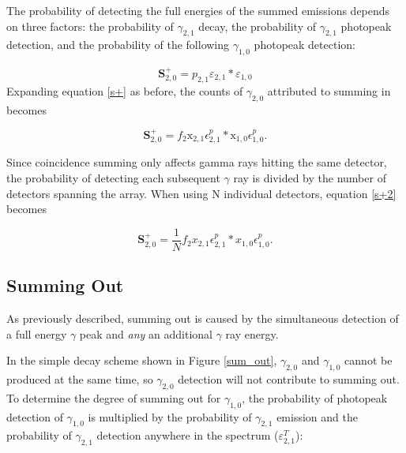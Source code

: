 \documentclass[12pt,twoside]{reedthesis}
\begin{document}
The probability of detecting the full energies of the summed emissions depends on three factors: the probability of $\gamma_{2,1}$ decay, the probability of $\gamma_{2,1}$ photopeak detection, and the probability of the following $\gamma_{1,0}$ photopeak detection:

\begin{equation}
\textbf{S}_{2,0}^{+} = p_{2,1} \varepsilon_{2,1}*\varepsilon_{1,0}
\label{s+}
\end{equation}
Expanding equation \ref{s+} as before, the counts of $\gamma_{2,0}$ attributed to summing in becomes

\begin{equation}
\textbf{S}_{2,0}^{+} = f_{2} \text{x}_{2,1} \epsilon^{p}_{2,1} * \text{x}_{1,0} \epsilon^{p}_{1,0}.
\label{s+2}
\end{equation}

Since coincidence summing only affects gamma rays hitting the same detector, the probability of detecting each subsequent $\gamma$ ray is divided by the number of detectors spanning the array. When using N individual detectors, equation \ref{s+2} becomes

\begin{equation}
\textbf{S}_{2,0}^{+} = \frac{1}{N} f_{2} x_{2,1} \epsilon^{p}_{2,1} * x_{1,0} \epsilon^{p}_{1,0}.
\label{s+3}
\end{equation}

\subsection{Summing Out}


As previously described, summing out is caused by the simultaneous detection of a full energy $\gamma$ peak and \textit{any} an additional $\gamma$ ray energy. 

In the simple decay scheme shown in Figure \ref{sum_out}, $\gamma_{2,0}$ and $\gamma_{1,0}$ cannot be produced at the same time, so $\gamma_{2,0}$ detection will not contribute to summing out. To determine the degree of summing out for $\gamma_{1,0}$, the probability of photopeak detection of $\gamma_{1,0}$ is multiplied by the probability of $\gamma_{2,1}$ emission and the probability of $\gamma_{2,1}$ detection anywhere in the spectrum ($\varepsilon^{T}_{2,1}$):
\end{document}
